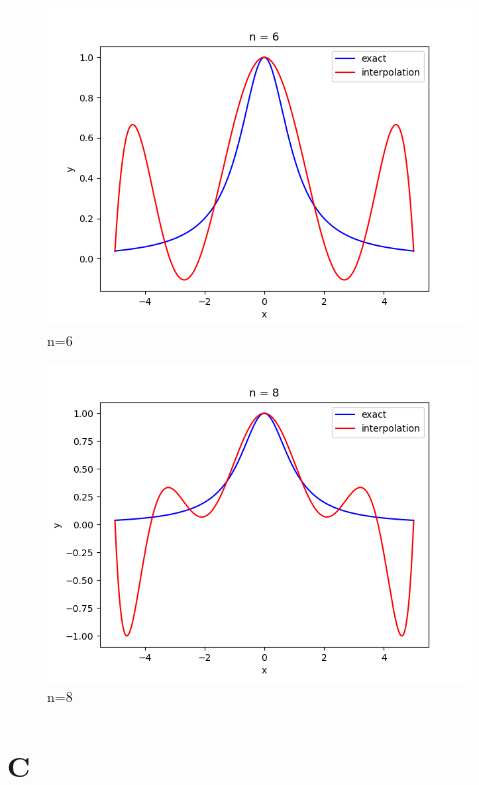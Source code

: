 \documentclass{article}
\begin{document}
    \begin{figure}[H]
        \centering
        \includegraphics{../code/output/B_n6.png}
        \caption{n=6}
    \end{figure} 

    \begin{figure}[H]
        \centering
        \includegraphics{../code/output/B_n8.png}
        \caption{n=8}
    \end{figure} 

\section{C}
\end{document}
